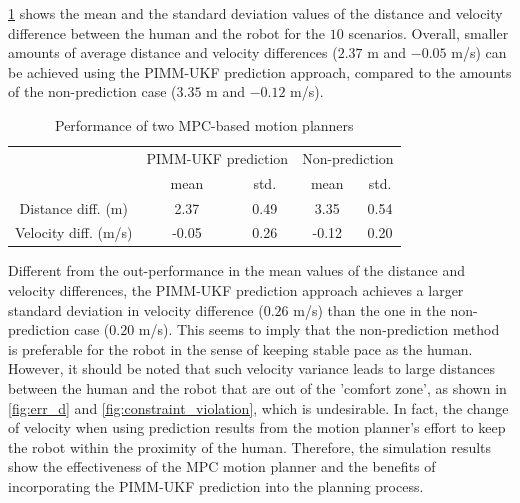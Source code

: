 \documentclass[journal]{IEEEtran}
\begin{document}
    \cref{table:MPC_RMS_error} shows the mean and the standard deviation values of the distance and velocity difference between the human and the robot for the $10$ scenarios. 
    Overall, smaller amounts of average distance and velocity differences ($2.37$ m and $-0.05$ m/s) can be achieved using the PIMM-UKF prediction approach, compared to the amounts of the non-prediction case ($3.35$ m and $-0.12$ m/s). 
\begin{table}[tbp]
\centering
\caption{Performance of two MPC-based motion planners} %
\label{table:MPC_RMS_error}
\begin{tabular}{|c|c|c|c|c|}
\hline
\multirow{2}{*}{}& \multicolumn{2}{c|}{PIMM-UKF prediction} & \multicolumn{2}{c|}{Non-prediction}\\ \cline{2-5}& ~mean~& std.& ~mean~& std. \\ \hline
\multicolumn{1}{|c|}{Distance diff. (m)}& 2.37& 0.49& 3.35& 0.54\\ \hline
\multicolumn{1}{|c|}{Velocity diff. (m/s)} & -0.05& 0.26& -0.12& 0.20\\ \hline
\end{tabular}
\end{table}
Different from the out-performance in the mean values of the distance and velocity differences, the PIMM-UKF prediction approach achieves a larger standard deviation in velocity difference ($0.26$ m/s) than the one in the non-prediction case ($0.20$ m/s).
	This seems to imply that the non-prediction method is preferable for the robot in the sense of keeping stable pace as the human.
	However, it should be noted that such velocity variance leads to large distances between the human and the robot that are out of the 'comfort zone', as shown in \cref{fig:err_d} and \cref{fig:constraint_violation}, which is undesirable.
	In fact, the change of velocity when using prediction results from the motion planner's effort to keep the robot within the proximity of the human.
	Therefore, the simulation results show the effectiveness of the MPC motion planner and the benefits of incorporating the PIMM-UKF prediction into the planning process.
\end{document}
